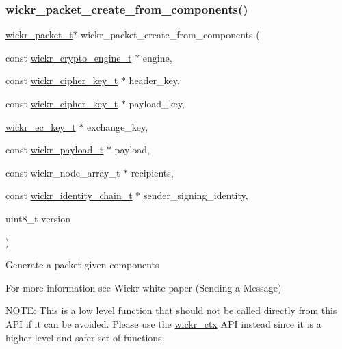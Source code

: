 \subsubsection{\texorpdfstring{wickr\+\_\+packet\+\_\+create\+\_\+from\+\_\+components()}{wickr\_packet\_create\_from\_components()}}
{\footnotesize\ttfamily \hyperlink{structwickr__packet}{wickr\+\_\+packet\+\_\+t}$\ast$ wickr\+\_\+packet\+\_\+create\+\_\+from\+\_\+components (\begin{DoxyParamCaption}\item[{const \hyperlink{structwickr__crypto__engine}{wickr\+\_\+crypto\+\_\+engine\+\_\+t} $\ast$}]{engine,  }\item[{const \hyperlink{structwickr__cipher__key}{wickr\+\_\+cipher\+\_\+key\+\_\+t} $\ast$}]{header\+\_\+key,  }\item[{const \hyperlink{structwickr__cipher__key}{wickr\+\_\+cipher\+\_\+key\+\_\+t} $\ast$}]{payload\+\_\+key,  }\item[{\hyperlink{structwickr__ec__key}{wickr\+\_\+ec\+\_\+key\+\_\+t} $\ast$}]{exchange\+\_\+key,  }\item[{const \hyperlink{structwickr__payload}{wickr\+\_\+payload\+\_\+t} $\ast$}]{payload,  }\item[{const wickr\+\_\+node\+\_\+array\+\_\+t $\ast$}]{recipients,  }\item[{const \hyperlink{structwickr__identity__chain}{wickr\+\_\+identity\+\_\+chain\+\_\+t} $\ast$}]{sender\+\_\+signing\+\_\+identity,  }\item[{uint8\+\_\+t}]{version }\end{DoxyParamCaption})}

Generate a packet given components

For more information see Wickr white paper (Sending a Message)

N\+O\+TE\+: This is a low level function that should not be called directly from this A\+PI if it can be avoided. Please use the \textquotesingle{}\hyperlink{structwickr__ctx}{wickr\+\_\+ctx}\textquotesingle{} A\+PI instead since it is a higher level and safer set of functions


